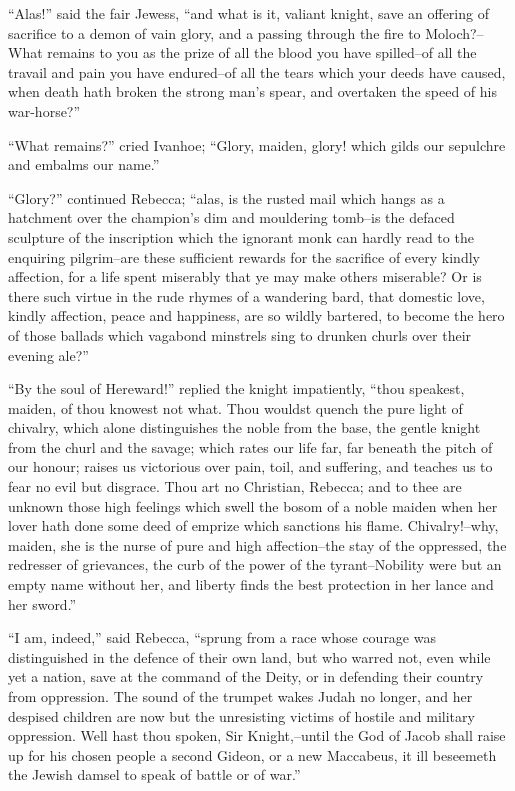 ``Alas!'' said the fair Jewess, ``and what is it, valiant knight, save
an offering of sacrifice to a demon of vain glory, and a passing through
the fire to Moloch?--What remains to you as the prize of all the blood
you have spilled--of all the travail and pain you have endured--of all
the tears which your deeds have caused, when death hath broken the
strong man's spear, and overtaken the speed of his war-horse?''

``What remains?'' cried Ivanhoe; ``Glory, maiden, glory! which gilds our
sepulchre and embalms our name.''

``Glory?'' continued Rebecca; ``alas, is the rusted mail which hangs as
a hatchment over the champion's dim and mouldering tomb--is the defaced
sculpture of the inscription which the ignorant monk can hardly read to
the enquiring pilgrim--are these sufficient rewards for the sacrifice of
every kindly affection, for a life spent miserably that ye may make
others miserable? Or is there such virtue in the rude rhymes of a
wandering bard, that domestic love, kindly affection, peace and
happiness, are so wildly bartered, to become the hero of those ballads
which vagabond minstrels sing to drunken churls over their evening
ale?''

``By the soul of Hereward!'' replied the knight impatiently, ``thou
speakest, maiden, of thou knowest not what. Thou wouldst quench the pure
light of chivalry, which alone distinguishes the noble from the base,
the gentle knight from the churl and the savage; which rates our life
far, far beneath the pitch of our honour; raises us victorious over
pain, toil, and suffering, and teaches us to fear no evil but disgrace.
Thou art no Christian, Rebecca; and to thee are unknown those high
feelings which swell the bosom of a noble maiden when her lover hath
done some deed of emprize which sanctions his flame. Chivalry!--why,
maiden, she is the nurse of pure and high affection--the stay of the
oppressed, the redresser of grievances, the curb of the power of the
tyrant--Nobility were but an empty name without her, and liberty finds
the best protection in her lance and her sword.''

``I am, indeed,'' said Rebecca, ``sprung from a race whose courage was
distinguished in the defence of their own land, but who warred not, even
while yet a nation, save at the command of the Deity, or in defending
their country from oppression. The sound of the trumpet wakes Judah no
longer, and her despised children are now but the unresisting victims of
hostile and military oppression. Well hast thou spoken, Sir
Knight,--until the God of Jacob shall raise up for his chosen people a
second Gideon, or a new Maccabeus, it ill beseemeth the Jewish damsel to
speak of battle or of war.''

